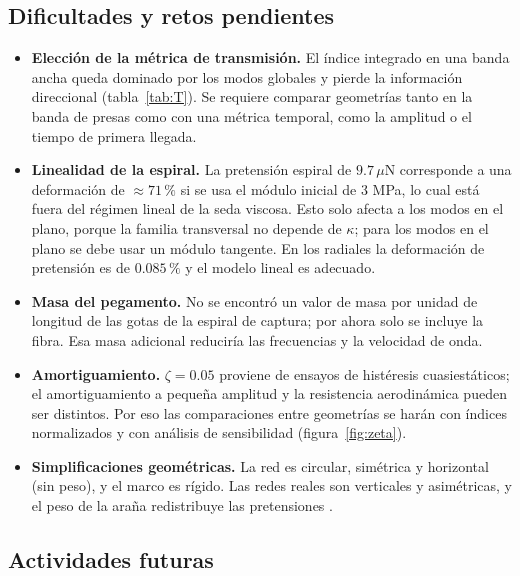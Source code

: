 \documentclass[11pt,letterpaper]{article}
\newcommand{\uN}{\,\mu\mathrm{N}}
\begin{document}
\subsection{Dificultades y retos pendientes}\label{sec:dificultades}

\begin{itemize}
    \item \textbf{Elección de la métrica de transmisión.} El índice
    integrado en una banda ancha queda dominado por los modos globales y
    pierde la información direccional (tabla~\ref{tab:T}). Se requiere
    comparar geometrías tanto en la banda de presas como con una métrica
    temporal, como la amplitud o el tiempo de primera llegada.
    \item \textbf{Linealidad de la espiral.} La pretensión espiral de
    $9.7\uN$ corresponde a una deformación de $\approx71\,\%$ si se usa el
    módulo inicial de 3 MPa, lo cual está fuera del régimen lineal de la
    seda viscosa. Esto solo afecta a los modos en el plano, porque la
    familia transversal no depende de $\kappa$; para los modos en el plano
    se debe usar un módulo tangente. En los radiales la deformación de
    pretensión es de $0.085\,\%$ y el modelo lineal es adecuado.
    \item \textbf{Masa del pegamento.} No se encontró un valor de masa por
    unidad de longitud de las gotas de la espiral de captura; por ahora
    solo se incluye la fibra. Esa masa adicional reduciría las frecuencias
    y la velocidad de onda.
    \item \textbf{Amortiguamiento.} $\zeta=0.05$ proviene de ensayos de
    histéresis cuasiestáticos; el amortiguamiento a pequeña amplitud y la
    resistencia aerodinámica pueden ser distintos. Por eso las comparaciones
    entre geometrías se harán con índices normalizados y con análisis de
    sensibilidad (figura~\ref{fig:zeta}).
    \item \textbf{Simplificaciones geométricas.} La red es circular,
    simétrica y horizontal (sin peso), y el marco es rígido. Las redes
    reales son verticales y asimétricas, y el peso de la araña redistribuye
    las pretensiones \cite{yavuz2024}.
\end{itemize}

\subsection{Actividades futuras}
\end{document}
